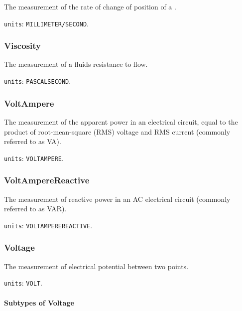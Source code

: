 The measurement of the rate of change of position of a .


\texttt{units}: \texttt{MILLIMETER/SECOND}.


\subsubsection{Viscosity}
\label{sec:Viscosity}



The measurement of a fluids resistance to flow.


\texttt{units}: \texttt{PASCAL\textunderscore SECOND}.


\subsubsection{VoltAmpere}
\label{sec:VoltAmpere}



The measurement of the apparent power in an electrical circuit, equal to the product of root-mean-square (RMS) voltage and RMS current (commonly referred to as VA).


\texttt{units}: \texttt{VOLT\textunderscore AMPERE}.


\subsubsection{VoltAmpereReactive}
\label{sec:VoltAmpereReactive}



The measurement of reactive power in an AC electrical circuit (commonly referred to as VAR).


\texttt{units}: \texttt{VOLT\textunderscore AMPERE\textunderscore REACTIVE}.


\subsubsection{Voltage}
\label{sec:Voltage}



The measurement of electrical potential between two points.


\texttt{units}: \texttt{VOLT}.

\paragraph{Subtypes of Voltage}\mbox{}
\label{sec:Subtypes of Voltage}

